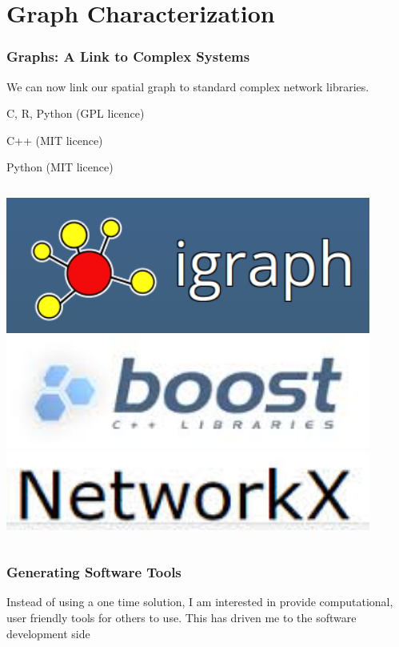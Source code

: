 \documentclass[10pt]{beamer}
\begin{document}
\section{Graph Characterization}
\begin{frame}
  \frametitle{Graphs: A Link to Complex Systems}
  We can now link our spatial graph to standard complex network libraries.
  \begin{description}[t]
      \item[IGraph] C, R, Python (GPL licence)
      \item[Boost: Graph and GraphParallel] C++ (MIT licence)
      \item[NetworkX] Python (MIT licence)
  \end{description}

  \vspace{1cm}
  \begin{columns}[onlytextwidth]
      \includegraphics[width=0.9\textwidth]{./Figures/software_logos/igraph_tittle.png}
      \includegraphics[width=0.9\textwidth]{./Figures/software_logos/boost_logo.jpeg}
      \includegraphics[width=0.9\textwidth]{./Figures/software_logos/networkx_logo.jpeg}
  \end{columns}

\end{frame}
\begin{frame}
  \frametitle{Generating Software Tools}
  \centering

  \note
  {
    Instead of using a one time solution, I am interested in provide computational, user friendly tools for others to use.\newline
    This has driven me to the software development side
  }
\end{frame}
\end{document}
